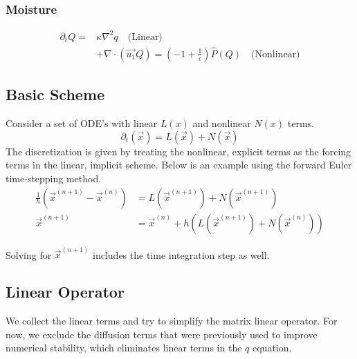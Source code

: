 \documentclass[10pt]{article}
\newcommand{\pd}[1]{\partial_{#1}}
\begin{document}
\subsubsection*{Moisture}
\begin{align*}
\pd{t} Q =& \kappa \nabla ^2 q \quad\text{(Linear)}\\
& + \nabla \cdot (\vec{u_1}Q) = \left(-1+\frac{1}{\epsilon}\right) \hat{P}(Q) \quad\text{(Nonlinear)}
\end{align*}

\subsection{Basic Scheme}
Consider a set of ODE's with linear $L(x)$  and nonlinear $N(x)$ terms.
\begin{equation}
\pd{t}(
\vec{x}) = L(\vec{x})+N(\vec{x}) 
\end{equation}
The discretization is given by treating the nonlinear, explicit terms as the forcing terms in the linear, implicit scheme. Below is an example using the forward Euler time-stepping method. 
\begin{align*}
\frac{1}{h}\left(\vec{x}^{(n+1)}-\vec{x}^{(n)}\right) &= L(\vec{x}^{(n+1)}) + N(\vec{x}^{(n+1)}) \\
\vec{x}^{(n+1)} &= \vec{x}^{(n)}+h\left(L(\vec{x}^{(n+1)}) + N(\vec{x}^{(n)}) \right)
\end{align*}

Solving for $\vec{x}^{(n+1)}$ includes the time integration step as well. 

\subsection{Linear Operator}
We collect the linear terms and try to simplify the matrix linear operator. For now, we exclude the diffusion terms that were previously used to improve numerical stability, which eliminates linear terms in the $q$ equation.
\end{document}
